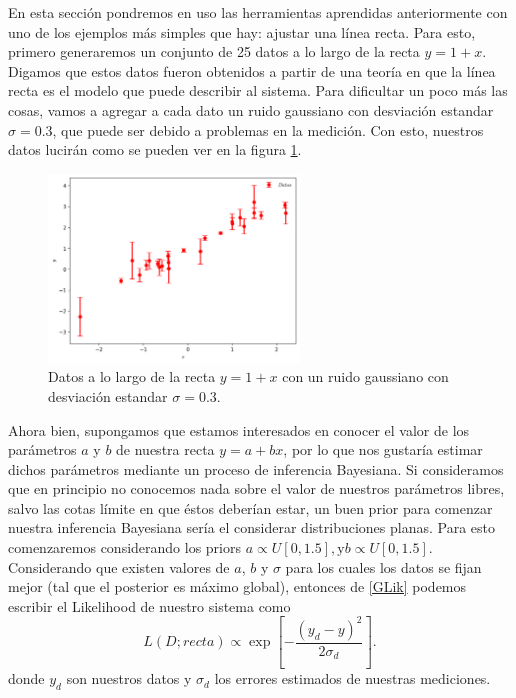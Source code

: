 \documentclass[10.5pt,prb,
               showpacs,            %
               preprintnumbers,     %
               aps,                 %
               prl,          	    %
               letterpaper,             %
               superscriptaddress,      %
               nofootinbib,         %
               tightenlines,        %
               floats,floatfix      %
               ,usenatbib]{revtex4-1}%
\begin{document}
En esta secci\'on pondremos en uso las herramientas aprendidas anteriormente con uno de los 
ejemplos m\'as simples que hay: ajustar una l\'inea recta. Para esto, primero generaremos un 
conjunto de 25 datos a lo largo de la recta $y=1+x$. Digamos que estos datos fueron obtenidos 
a partir de una teor\'ia en que la l\'inea recta es el modelo que puede describir al sistema. 
Para dificultar un poco m\'as las cosas, vamos a agregar a cada dato un ruido gaussiano con 
desviaci\'on estandar $\sigma = 0.3$, que puede ser debido a problemas en la medici\'on. 
Con esto, nuestros datos lucir\'an como se pueden ver en la figura \ref{dat}.


\begin{figure}[ht] 
\includegraphics[trim = 1mm  1mm 1mm 1mm, clip, width=8.cm, height=5cm]{data.png}
\caption{Datos a lo largo 
de la recta $y=1+x$ con un ruido gaussiano con desviaci\'on estandar $\sigma = 0.3$.}%
\label{dat}
\end{figure}


Ahora bien, supongamos que estamos interesados en conocer el valor de los par\'ametros 
$a$ y $b$ de nuestra recta $y=a+bx$, por lo que nos gustar\'ia estimar dichos par\'ametros 
mediante un proceso de inferencia Bayesiana. Si consideramos que en principio no conocemos nada sobre el valor de 
nuestros par\'ametros libres, salvo las cotas l\'imite en que \'estos deber\'ian estar, un buen prior para 
comenzar nuestra inferencia Bayesiana ser\'ia el considerar distribuciones planas. Para esto comenzaremos considerando los priors
%
	$
		a \propto U[0,1.5],  \text{y}  b \propto U[0,1.5].
	$
\\
Considerando que existen valores de $a$, $b$ y $\sigma$ para los cuales los datos se fijan mejor 
(tal que el posterior es m\'aximo global), entonces de \eqref{GLik} podemos escribir el Likelihood de nuestro sistema como 
%
	\begin{equation}
		L(D;recta)\propto \exp\left[-\frac{(y_d-y)^2}{2\sigma_d}\right].
	\end{equation}
donde $y_d$ son nuestros datos y $\sigma_d$ los errores estimados de nuestras mediciones.
\end{document}
